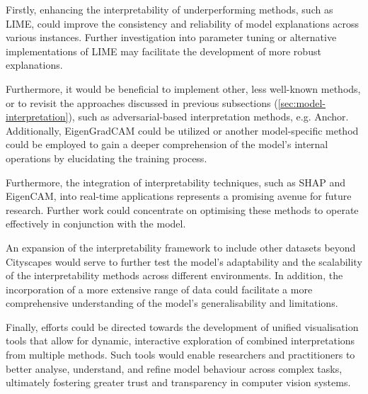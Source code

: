 Firstly, enhancing the interpretability of underperforming methods, such as LIME, could improve the consistency and reliability of model explanations across various instances.
Further investigation into parameter tuning or alternative implementations of LIME may facilitate the development of more robust explanations.

Furthermore, it would be beneficial to implement other, less well-known methods, or to revisit the approaches discussed in previous subsections (\ref{sec:model-interpretation}), such as adversarial-based interpretation methods, e.g. Anchor\cite{LIANG2021168}.
Additionally, EigenGradCAM could be utilized or another model-specific method could be employed to gain a deeper comprehension of the model's internal operations by elucidating the training process.

Furthermore, the integration of interpretability techniques, such as SHAP and EigenCAM, into real-time applications represents a promising avenue for future research.
Further work could concentrate on optimising these methods to operate effectively in conjunction with the model.

An expansion of the interpretability framework to include other datasets beyond Cityscapes would serve to further test the model's adaptability and the scalability of the interpretability methods across different environments. In addition, the incorporation of a more extensive range of data could facilitate a more comprehensive understanding of the model's generalisability and limitations.

Finally, efforts could be directed towards the development of unified visualisation tools that allow for dynamic, interactive exploration of combined interpretations from multiple methods.
Such tools would enable researchers and practitioners to better analyse, understand, and refine model behaviour across complex tasks, ultimately fostering greater trust and transparency in computer vision systems.